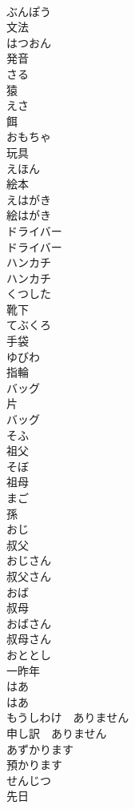 \documentclass[8pt]{extreport}
\begin{document}
\begin{CJK}{UTF8}{min}
\\	ぶんぽう	
\\	文法		
\\	はつおん	
\\	発音		
\\	さる	
\\	猿		
\\	えさ	
\\	餌		
\\	おもちゃ	
\\	玩具	
\\	えほん	
\\	絵本		
\\	えはがき	
\\	絵はがき		
\\	ドライバー	
\\	ドライバー		
\\	ハンカチ	
\\	ハンカチ		
\\	くつした	
\\	靴下	
\\	てぶくろ	
\\	手袋		
\\	ゆびわ	
\\	指輪		
\\	バッグ	
\\	片 
\\	バッグ		
\\	そふ	
\\	祖父		
\\	そぼ	
\\	祖母		
\\	まご	
\\	孫		
\\	おじ	
\\	叔父		
\\	おじさん	
\\	叔父さん		
\\	おば	
\\	叔母		
\\	おばさん	
\\	叔母さん		
\\	おととし	
\\	一昨年		
\\	はあ	
\\	はあ		
\\	もうしわけ　ありません	
\\	申し訳　ありません	
\\	あずかります	
\\	預かります		
\\	せんじつ	
\\	先日		

\end{CJK}
\end{document}

